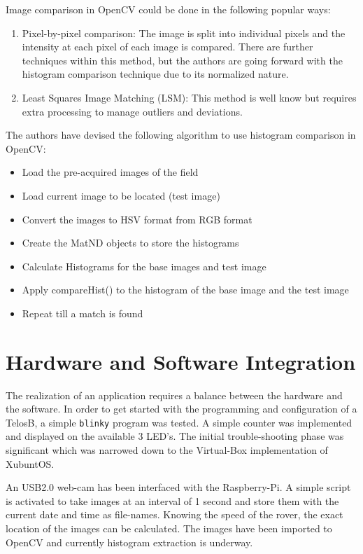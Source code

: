 \documentclass{sig-alternate-05-2015}
\begin{document}
Image comparison in OpenCV could be done in the following popular ways:
\begin{enumerate}
\item Pixel-by-pixel comparison:
	The image is split into individual pixels and the intensity at each pixel of each image is compared. There are further techniques within this method, but the authors are going forward with the histogram comparison\cite{hist:hist} technique due to its normalized nature.
\item Least Squares Image Matching (LSM):
	This method is well know but requires extra processing to manage outliers and deviations.
\end{enumerate}

The authors have devised the following algorithm to use histogram comparison in OpenCV:

\begin{itemize}
\item Load the pre-acquired images of the field
\item Load current image to be located (test image)
\item Convert the images to HSV format from RGB format
\item Create the MatND objects to store the histograms
\item Calculate Histograms for the base images and test image
\item Apply  compareHist() to the histogram of the base image and the test image
\item Repeat till a match is found
\end{itemize}


\section{Hardware and Software Integration}
The realization of an application requires a balance between the hardware and the software. In order to get started with the programming and configuration of a TelosB, a simple \texttt{blinky} program was tested. A simple counter was implemented and displayed on the available 3 LED's. The initial trouble-shooting phase was significant which was narrowed down to the Virtual-Box\cite{vbox:vbox} implementation of XubuntOS.

An USB2.0 web-cam has been interfaced with the Raspberry-Pi. A simple script is activated to take images at an interval of 1 second and store them with the current date and time as file-names. Knowing the speed of the rover, the exact location of the images can be calculated. The images have been imported to OpenCV and currently histogram extraction is underway.
\end{document}

